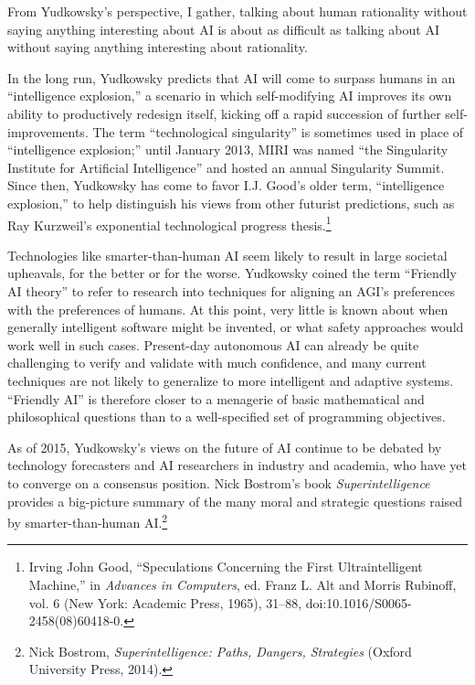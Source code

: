 {
 From Yudkowsky's perspective, I gather, talking
about human rationality without saying anything interesting about AI is
about as difficult as talking about AI without saying anything
interesting about rationality.}

{
 In the long run, Yudkowsky predicts that AI will come to surpass
humans in an ``intelligence
explosion,'' a scenario in which self-modifying AI
improves its own ability to productively redesign itself, kicking off a
rapid succession of further self-improvements. The term
``technological singularity'' is
sometimes used in place of ``intelligence
explosion;'' until January 2013, MIRI was named
``the Singularity Institute for Artificial
Intelligence'' and hosted an annual Singularity
Summit. Since then, Yudkowsky has come to favor I.J.
Good's older term, ``intelligence
explosion,'' to help distinguish his views from other
futurist predictions, such as Ray Kurzweil's
exponential technological progress thesis.\footnote{Irving John Good, ``Speculations Concerning
the First Ultraintelligent Machine,'' in
\textit{Advances in Computers}, ed. Franz L. Alt and Morris Rubinoff,
vol. 6 (New York: Academic Press, 1965), 31--88,
doi:10.1016/S0065-2458(08)60418-0.}}

{
 Technologies like smarter-than-human AI seem likely to result in
large societal upheavals, for the better or for the worse. Yudkowsky
coined the term ``Friendly AI
theory'' to refer to research into techniques for
aligning an AGI's preferences with the preferences of
humans. At this point, very little is known about when generally
intelligent software might be invented, or what safety approaches would
work well in such cases. Present-day autonomous AI can already be quite
challenging to verify and validate with much confidence, and many
current techniques are not likely to generalize to more intelligent and
adaptive systems. ``Friendly AI'' is
therefore closer to a menagerie of basic mathematical and philosophical
questions than to a well-specified set of programming objectives.}

{
 As of 2015, Yudkowsky's views on the future of AI
continue to be debated by technology forecasters and AI researchers in
industry and academia, who have yet to converge on a consensus
position. Nick Bostrom's book
\textit{Superintelligence} provides a big-picture summary of the many
moral and strategic questions raised by smarter-than-human
AI.\footnote{Nick Bostrom, \textit{Superintelligence: Paths, Dangers,
Strategies} (Oxford University Press, 2014).}}

